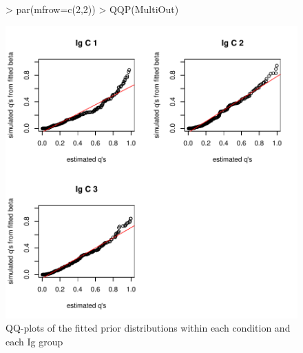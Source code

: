 \documentclass{article}
\begin{document}
\begin{figure}[h!]
\centering
\begin{Schunk}
\begin{Sinput}
> par(mfrow=c(2,2))
> QQP(MultiOut)
\end{Sinput}
\end{Schunk}
\includegraphics{EBSeq_Vignette-040}
\caption{ QQ-plots of the fitted prior distributions within each condition and each Ig group}
\label{fig:GeneMultiQQ}
\end{figure}
\end{document}
